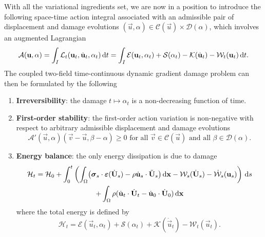 With all the variational ingredients set, we are now in a position to introduce the following space-time action integral associated with an admissible pair of displacement and damage evolutions $(\vec{u},\alpha)\in\mathcal{C}(\vec{u})\times\mathcal{D}(\alpha)$, which involves an augmented Lagrangian
\begin{equation} \label{eq:actionG}
\mathcal{A}(\vec{u},\alpha)=\int_I\mathcal{L}_t(\vec{u}_t,\dot{\vec{u}}_t,\alpha_t)\,\mathrm{d}t=\int_I\mathcal{E}(\vec{u}_t,\alpha_t)+\mathcal{S}(\alpha_t)-\mathcal{K}(\dot{\vec{u}}_t)-\mathcal{W}_t(\vec{u}_t)\D{t}.
\end{equation}
The coupled two-field time-continuous dynamic gradient damage problem can then be formulated by the following
\begin{definition} \label{def:dynagraddama} \noindent
\begin{enumerate}
\item \textbf{Irreversibility}: the damage $t\mapsto\alpha_t$ is a non-decreasing function of time.
\item \textbf{First-order stability}: the first-order action variation is non-negative with respect to arbitrary admissible displacement and damage evolutions
\begin{equation} \label{eq:vi}
\mathcal{A}'(\vec{u},\alpha)(\vec{v}-\vec{u},\beta-\alpha)\geq 0\text{ for all $\vec{v}\in\mathcal{C}(\vec{u})$ and all $\beta\in\mathcal{D}(\alpha)$}.
\end{equation}
\item \textbf{Energy balance}: the only energy dissipation is due to damage
\begin{multline} \label{eq:dyngdeb}
\mathcal{H}_t=\mathcal{H}_0+\int_0^t\left(\int_\Omega\bigl(\sig_s\cdot\eps(\dot{\vec{U}}_s)-\rho\dot{\vec{u}}_s\cdot\ddot{\vec{U}}_s\bigr)\dx-\mathcal{W}_s(\dot{\vec{U}}_s)-\dot{\mathcal{W}}_s(\vec{u}_s)\right)\D{s} \\
+\int_\Omega\rho(\dot{\vec{u}}_t\cdot\dot{\vec{U}}_t-\dot{\vec{u}}_0\cdot\dot{\vec{U}}_0)\dx
\end{multline}
where the total energy is defined by
\[
\mathcal{H}_t=\mathcal{E}(\vec{u}_t,\alpha_t)+\mathcal{S}(\alpha_t)+\mathcal{K}(\dot{\vec{u}}_t)-\mathcal{W}_t(\vec{u}_t).
\]
\end{enumerate}
\end{definition}

